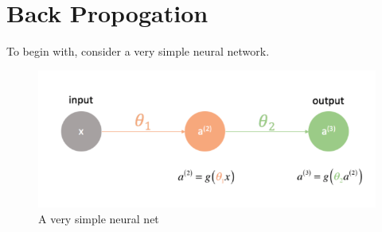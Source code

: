 \documentclass[10pt]{article}
\begin{document}
\section{Back Propogation}%

To begin with, consider a very simple neural network. 
\begin{figure}[htpb]
	\centering
	\includegraphics[width=0.8\linewidth]{simple_nn.png}
	\caption{A very simple neural net}%
	\label{fig:simple_nn}
\end{figure}
\end{document}
